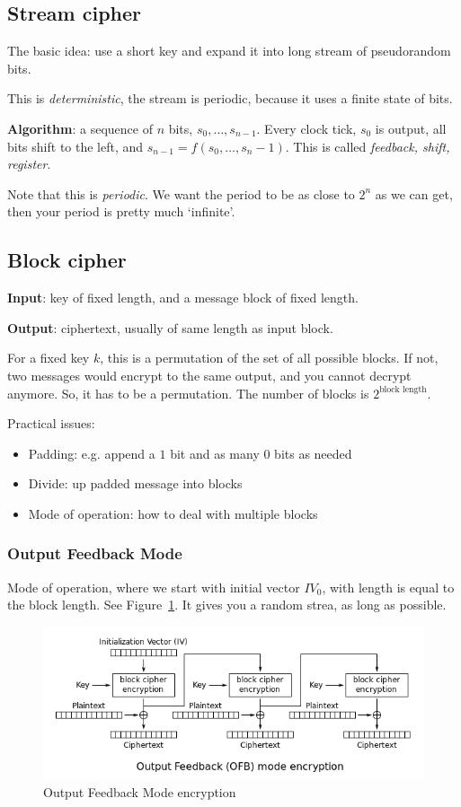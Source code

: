 \documentclass[language=english,number=]{homework}
\begin{document}
\subsection{Stream cipher}

The basic idea: use a short key and expand it into long stream of pseudorandom bits.

This is \textit{deterministic}, the stream is periodic, because it uses a finite state of bits.

\textbf{Algorithm}: a sequence of $n$ bits, $s_0, \dots, s_{n-1}$.
Every clock tick, $s_0$ is output, all bits shift to the left, and $s_{n-1} = f(s_0, \dots, s_n-1)$.
This is called \textit{feedback, shift, register}.

Note that this is \textit{periodic}.
We want the period to be as close to $2^n$ as we can get, then your period is pretty much `infinite'.

\subsection{Block cipher}

\textbf{Input}: key of fixed length, and a message block of fixed length.

\textbf{Output}: ciphertext, usually of same length as input block.

For a fixed key $k$, this is a permutation of the set of all possible blocks.
If not, two messages would encrypt to the same output, and you cannot decrypt anymore.
So, it has to be a permutation.
The number of blocks is $2^{\text{block length}}$.

Practical issues:
\begin{itemize}
\item Padding: e.g. append a $1$ bit and as many $0$ bits as needed
\item Divide: up padded message into blocks
\item Mode of operation: how to deal with multiple blocks
\end{itemize}

\subsubsection{Output Feedback Mode}

Mode of operation, where we start with initial vector $IV_0$, with length is equal to the block length.
See Figure~\ref{ofm}.
It gives you a random strea, as long as possible.

\begin{figure}
\centering
\includegraphics[width=\textwidth]{ofm.PNG}
\caption{Output Feedback Mode encryption}
\label{ofm}
\end{figure}
\end{document}
